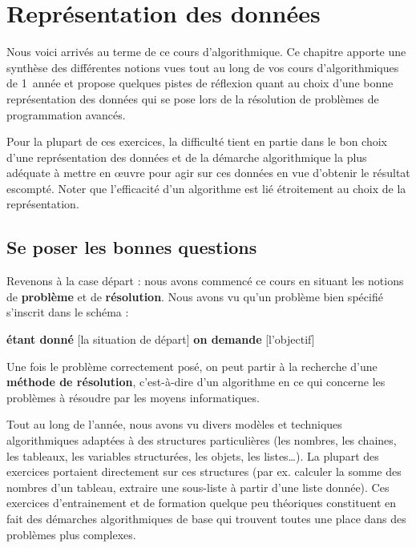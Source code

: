 \chapter{Représentation des données%
}

Nous voici arrivés au terme de ce cours d'algorithmique. 
Ce chapitre apporte une synthèse des différentes notions vues 
tout au long de vos cours d'algorithmiques de 1\iere\ année 
et propose quelques pistes de réflexion 
quant au choix d’une bonne représentation des données 
qui se pose lors de la résolution de problèmes de programmation avancés.

Pour la plupart de ces exercices,
la difficulté tient en partie dans le bon choix d’une représentation des données 
et de la démarche algorithmique la plus adéquate à mettre en œuvre pour agir sur ces
données en vue d’obtenir le résultat escompté. Noter que l’efficacité
d’un algorithme est lié étroitement au choix de la représentation.

\section{Se poser les bonnes questions}

Revenons à la case départ : nous avons commencé ce cours en situant les
notions de \textbf{problème} et de \textbf{résolution}. Nous avons vu
qu’un problème bien spécifié s’inscrit dans le schéma :

	\begin{center}
	\begin{Ovalbox}
		{\textbf{étant donné} [la situation de départ] 
		\textbf{on demande} [l’objectif]}
	\end{Ovalbox}
	\end{center}

Une fois le problème correctement posé, on peut partir à la recherche
d’une \textbf{méthode de résolution}, c’est-à-dire d’un algorithme en
ce qui concerne les problèmes à résoudre par les moyens informatiques.

Tout au long de l’année, nous avons vu divers modèles et techniques
algorithmiques adaptées à des structures particulières (les nombres,
les chaines, les tableaux, les variables structurées, les objets, les
listes\dots). La plupart des exercices portaient directement
sur ces structures (par ex. calculer la somme des nombres d’un tableau,
extraire une sous-liste à partir
d’une liste donnée). Ces exercices d’entrainement et de formation
quelque peu théoriques constituent en fait des démarches algorithmiques
de base qui trouvent toutes une place dans des problèmes plus
complexes.

